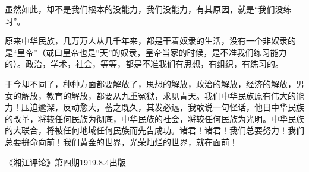 虽然如此，却不是我们根本的没能力，我们没能力，有其原因，就是“我们没练习”。

原来中华民族，几万万人从几千年来，都是干着奴隶的生活，没有一个非奴隶的是“皇帝”（或曰皇帝也是“天”的奴隶，皇帝当家的时候，是不准我们练习能力的）。政治，学术，社会，等等，都是不准我们有思想，有组织，有练习的。

于今却不同了，种种方面都要解放了，思想的解放，政治的解放，经济的解放，男女的解放，教育的解放，都要从九重冤狱，求见青天。我们中华民族原有伟大的能力！压迫逾深，反动愈大，蓄之既久，其发必远，我敢说一句怪话，他日中华民族的改革，将较任何民族为彻底，中华民族的社会，将较任何民族为光明。中华民族的大联合，将被任何地域任何民族而先告成功。诸君！诸君！我们总要努力！我们总要拚命向前！我们黄金的世界，光荣灿烂的世界，就在面前！

\begin{flushright}《湘江评论》第四期1919.8.4出版\end{flushright}

